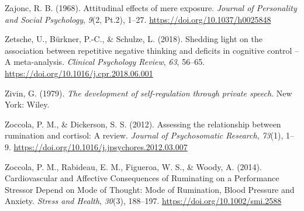 \documentclass[a4paper,12pt,twoside,onecolumn,openright,final,oldfontcommands]{memoir}
\begin{document}
\leavevmode\hypertarget{ref-zajonc_attitudinal_1968}{}%
Zajonc, R. B. (1968). Attitudinal effects of mere exposure. \emph{Journal of Personality and Social Psychology}, \emph{9}(2, Pt.2), 1--27. \url{https://doi.org/10.1037/h0025848}

\leavevmode\hypertarget{ref-zetsche_shedding_2018}{}%
Zetsche, U., Bürkner, P.-C., \& Schulze, L. (2018). Shedding light on the association between repetitive negative thinking and deficits in cognitive control -- A meta-analysis. \emph{Clinical Psychology Review}, \emph{63}, 56--65. \url{https://doi.org/10.1016/j.cpr.2018.06.001}

\leavevmode\hypertarget{ref-zivin_development_1979}{}%
Zivin, G. (1979). \emph{The development of self-regulation through private speech}. New York: Wiley.

\leavevmode\hypertarget{ref-zoccola_assessing_2012}{}%
Zoccola, P. M., \& Dickerson, S. S. (2012). Assessing the relationship between rumination and cortisol: A review. \emph{Journal of Psychosomatic Research}, \emph{73}(1), 1--9. \url{https://doi.org/10.1016/j.jpsychores.2012.03.007}

\leavevmode\hypertarget{ref-zoccola_cardiovascular_2014}{}%
Zoccola, P. M., Rabideau, E. M., Figueroa, W. S., \& Woody, A. (2014). Cardiovascular and Affective Consequences of Ruminating on a Performance Stressor Depend on Mode of Thought: Mode of Rumination, Blood Pressure and Anxiety. \emph{Stress and Health}, \emph{30}(3), 188--197. \url{https://doi.org/10.1002/smi.2588}
\end{document}
